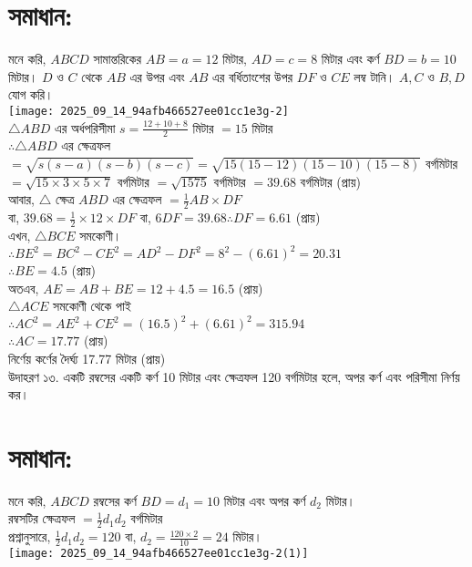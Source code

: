 \documentclass[10pt]{article}
\begin{document}
\section*{সমাধান:}
মনে করি, \(A B C D\) সামান্তরিকের \(A B=a=12\) মিটার, \(A D=c=8\) মিটার এবং কর্ণ \(B D=b=10\) মিটার। \(D\) ও \(C\) থেকে \(A B\) এর উপর এবং \(A B\) এর বর্ধিতাংশের উপর \(D F\) ও \(C E\) লম্ব টানি। \(A, C\) ও \(B, D\) যোগ করি।\\
\texttt{[image: 2025\_09\_14\_94afb466527ee01cc1e3g-2]}\\
\(\triangle A B D\) এর অর্ধপরিসীমা \(s=\frac{12+10+8}{2}\) মিটার \(=15\) মিটার\\
\(\therefore \triangle A B D\) এর ক্ষেত্রফল \(=\sqrt{s(s-a)(s-b)(s-c)}=\sqrt{15(15-12)(15-10)(15-8)}\) বর্গমিটার \(=\sqrt{15 \times 3 \times 5 \times 7}\) বর্গমিটার \(=\sqrt{1575}\) বর্গমিটার \(=39.68\) বর্গমিটার (প্রায়)\\
আবার, \(\triangle\) ক্ষেত্র \(A B D\) এর ক্ষেত্রফল \(=\frac{1}{2} A B \times D F\)\\
বা, \(39.68=\frac{1}{2} \times 12 \times D F\) বা, \(6 D F=39.68 \therefore D F=6.61\) (প্রায়)\\
এখন, \(\triangle B C E\) সমকোণী।\\
\(\therefore B E^{2}=B C^{2}-C E^{2}=A D^{2}-D F^{2}=8^{2}-(6.61)^{2}=20.31\)\\
\(\therefore B E=4.5\) (প্রায়)\\
অতএব, \(A E=A B+B E=12+4.5=16.5\) (প্রায়)\\
\(\triangle A C E\) সমকোণী থেকে পাই\\
\(\therefore A C^{2}=A E^{2}+C E^{2}=(16.5)^{2}+(6.61)^{2}=315.94\)\\
\(\therefore A C=17.77\) (প্রায়)\\
নির্ণেয় কর্ণের দৈর্ঘ্য 17.77 মিটার (প্রায়)\\
উদাহরণ ১৩. একটি রম্বসের একটি কর্ণ 10 মিটার এবং ক্ষেত্রফল 120 বর্গমিটার হলে, অপর কর্ণ এবং পরিসীমা নির্ণয় কর।

\section*{সমাধান:}
মনে করি, \(A B C D\) রম্বসের কর্ণ \(B D=d_{1}=10\) মিটার এবং অপর কর্ণ \(d_{2}\) মিটার।\\
রম্বসটির ক্ষেত্রফল \(=\frac{1}{2} d_{1} d_{2}\) বর্গমিটার\\
প্রশ্নানুসারে, \(\frac{1}{2} d_{1} d_{2}=120\) বা, \(d_{2}=\frac{120 \times 2}{10}=24\) মিটার।\\
\texttt{[image: 2025\_09\_14\_94afb466527ee01cc1e3g-2(1)]}
\end{document}
